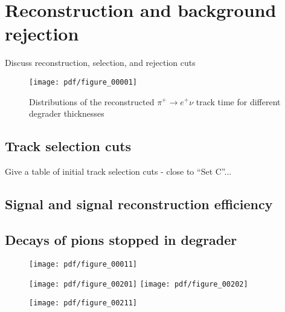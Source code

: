 \section {Reconstruction and background rejection}

Discuss reconstruction, selection, and rejection cuts

\begin{figure}
  \centering
  \texttt{[image: pdf/figure\_00001]}
  \caption{
    \label{fig:pions_timing}
    Distributions of the reconstructed $\pi^+ \to e^+ \nu$ track time for different degrader thicknesses
  }
\end{figure}



\subsection{Track selection cuts}

Give a table of initial track selection cuts - close to ``Set C''...


\subsection{Signal and signal reconstruction efficiency}

\subsection{Decays of pions stopped in degrader}

\begin{figure}[H]
  \texttt{[image: pdf/figure\_00011]}
  \caption{
  }
\end{figure}

\begin{figure}[H]
  \texttt{[image: pdf/figure\_00201]}
  \texttt{[image: pdf/figure\_00202]}
  \caption{
  }
\end{figure}

\begin{figure}[H]
  \texttt{[image: pdf/figure\_00211]}
  \caption{
  }
\end{figure}



